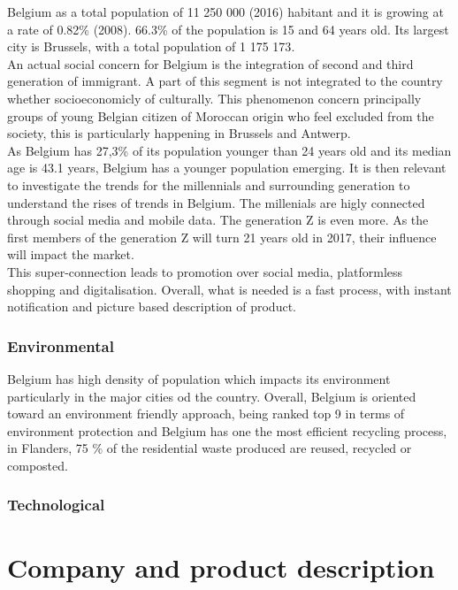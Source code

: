 \documentclass[12pt,a4paper,oneside]{book}
\begin{document}
Belgium as a total population of 11 250 000 (2016) habitant and it is growing at a rate of 0.82\% (2008). 66.3\% of the population is 15 and 64 years old. Its largest city is Brussels, with a total population of 1 175 173\cite{ciafb}.\\

An actual social concern for Belgium is the integration of second and third generation of immigrant. A part of this segment is not integrated to the country whether socioeconomicly of culturally. This phenomenon concern principally groups of young Belgian citizen of Moroccan origin who feel excluded from the society, this is particularly happening in Brussels and Antwerp\cite{sgikc}.\\

As Belgium has 27,3\% of its population younger than 24 years old and its median age is 43.1 years, Belgium has a younger population emerging\cite{ciafb}. It is then relevant to investigate the trends for the millennials and surrounding generation to understand the rises of trends in Belgium. The millenials are higly connected through social media and mobile data. The generation Z is even more. As the first members of the generation Z will turn 21 years old in 2017, their influence will impact the market.\\
This super-connection leads to promotion over social media, platformless shopping and digitalisation. Overall, what is needed is a fast process, with instant notification and picture based description of product\cite{stbe}.



\subsection{Environmental}

Belgium has high density of population which impacts its environment particularly in the major cities od the country. Overall, Belgium is oriented toward an environment friendly approach, being ranked top 9 in terms of environment protection and Belgium has one the most efficient recycling process, in Flanders, 75 \% of the residential waste produced are reused, recycled or composted\cite{wastemana}.

\subsection{Technological}



\chapter{Company and product description}
\end{document}
